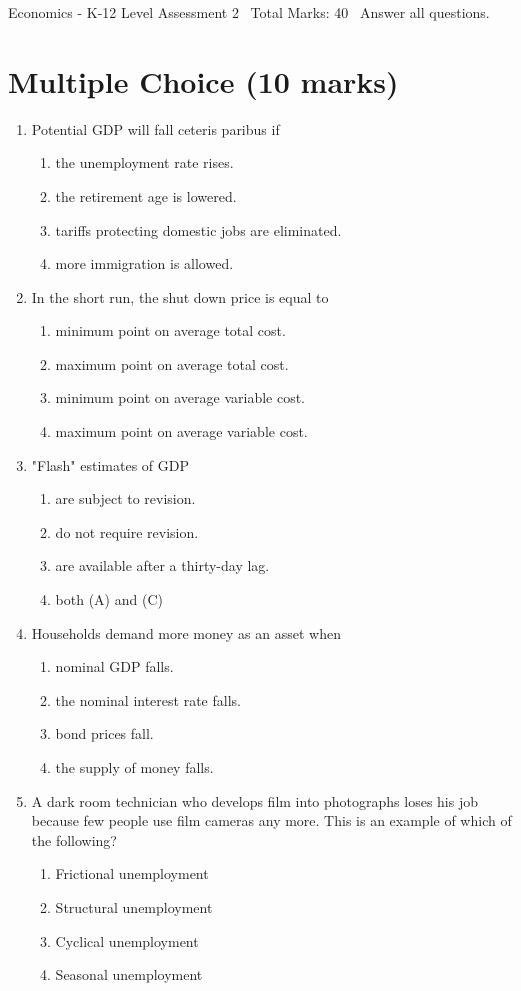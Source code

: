 \documentclass[12pt]{article}
\begin{document}
\begin{center}
Economics - K-12 Level Assessment 2 \
Total Marks: 40 \
Answer all questions.
\end{center}

\section*{Multiple Choice (10 marks)}
\begin{enumerate}[label=\arabic*.]
\item Potential GDP will fall ceteris paribus if
\begin{enumerate}[label=(\alph*)]
    \item the unemployment rate rises.
    \item the retirement age is lowered.
    \item tariffs protecting domestic jobs are eliminated.
    \item more immigration is allowed.
\end{enumerate}
\item In the short run, the shut down price is equal to
\begin{enumerate}[label=(\alph*)]
    \item minimum point on average total cost.
    \item maximum point on average total cost.
    \item minimum point on average variable cost.
    \item maximum point on average variable cost.
\end{enumerate}
\item "Flash" estimates of GDP
\begin{enumerate}[label=(\alph*)]
    \item are subject to revision.
    \item do not require revision.
    \item are available after a thirty-day lag.
    \item both (A) and (C)
\end{enumerate}
\item Households demand more money as an asset when
\begin{enumerate}[label=(\alph*)]
    \item nominal GDP falls.
    \item the nominal interest rate falls.
    \item bond prices fall.
    \item the supply of money falls.
\end{enumerate}
\item A dark room technician who develops film into photographs loses his job because few people
use film cameras any more. This is an example of which of the following?
\begin{enumerate}[label=(\alph*)]
    \item Frictional unemployment
    \item Structural unemployment
    \item Cyclical unemployment
    \item Seasonal unemployment
\end{enumerate}
\end{enumerate}
\end{document}
